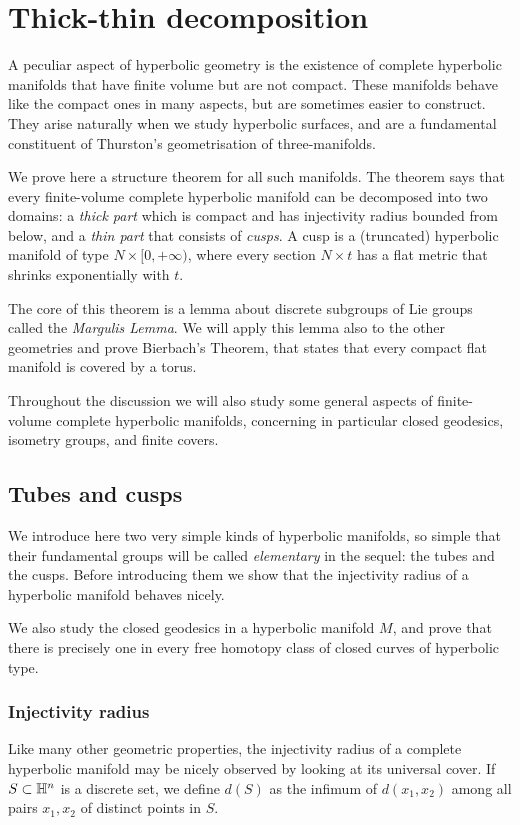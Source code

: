 

\chapter{Thick-thin decomposition} \label{thick-thin:chapter}
A peculiar aspect of hyperbolic geometry is the existence of complete hyperbolic manifolds that have finite volume but are not compact. These manifolds behave like the compact ones in many aspects, but are sometimes easier to construct. They arise naturally when we study hyperbolic surfaces, and are a fundamental constituent of Thurston's geometrisation of three-manifolds.

We prove here a structure theorem for all such manifolds. The theorem says that every finite-volume complete hyperbolic manifold can be decomposed into two domains: a \emph{thick part} which is compact and has injectivity radius bounded from below, and a \emph{thin part} that consists of \emph{cusps}. A cusp is a (truncated) hyperbolic manifold of type $N\times [0,+\infty)$, where every section $N\times t$ has a flat metric that shrinks exponentially with $t$. 

The core of this theorem is a lemma about discrete subgroups of Lie groups called the \emph{Margulis Lemma}. We will apply this lemma also to the other geometries and prove Bierbach's Theorem, that states that every compact flat manifold is covered by a torus.

Throughout the discussion we will also study some general aspects of finite-volume complete hyperbolic manifolds, concerning in particular closed geodesics, isometry groups, and finite covers.

\section{Tubes and cusps} \label{tubes:cusps:section}
We introduce here two very simple kinds of hyperbolic manifolds, so simple that their fundamental groups will be called \emph{elementary} in the sequel: the tubes and the cusps. Before introducing them we show that the injectivity radius of a hyperbolic manifold behaves nicely.

We also study the closed geodesics in a hyperbolic manifold $M$, and prove that there is precisely one in every free homotopy class of closed curves of hyperbolic type.

\subsection{Injectivity radius}
Like many other geometric properties, the injectivity radius of a complete hyperbolic manifold may be nicely observed by looking at its universal cover. If $S\subset \mathbb{H}^n$ is a discrete set, we define $d(S)$ as the infimum of $ d(x_1,x_2)$ among all pairs $x_1, x_2$ of distinct points in $S$. 

